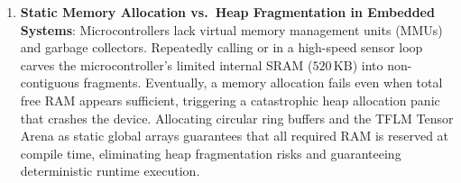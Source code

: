\begin{enumerate}
\begin{enumerate}
        \item \textbf{Battery Autonomy in Days}:
        \begin{align*}
        T_{\text{hours}} &= \frac{2{,}000\,\text{mAh}}{0.5280\,\text{mA}} \approx 3{,}787.9\,\text{hours} \\
        T_{\text{days}} &= \frac{3{,}787.9}{24} \approx \mathbf{157.8\,\text{days}} \quad (\approx \mathbf{5.2\,\text{months}})
        \end{align*}

        \item \textbf{Continuous Wi-Fi Streaming Comparison}:
        \begin{equation*}
        T_{\text{continuous}} = \frac{2{,}000\,\text{mAh}}{150.0\,\text{mA}} \approx \mathbf{13.33\,\text{hours}} \quad (\approx \mathbf{0.56\,\text{days}})
        \end{equation*}
        TinyML extends operational lifetime by over $\mathbf{280\times}$!
    \end{enumerate}

    \item \textbf{Static Memory Allocation vs.\ Heap Fragmentation in Embedded Systems}:
    Microcontrollers lack virtual memory management units (MMUs) and garbage collectors. Repeatedly calling  or  in a high-speed sensor loop carves the microcontroller's limited internal SRAM ($520\,\text{KB}$) into non-contiguous fragments. 
    Eventually, a memory allocation fails even when total free RAM appears sufficient, triggering a catastrophic heap allocation panic that crashes the device. 
    Allocating circular ring buffers and the TFLM Tensor Arena as static global arrays guarantees that all required RAM is reserved at compile time, eliminating heap fragmentation risks and guaranteeing deterministic runtime execution.
\end{enumerate}
